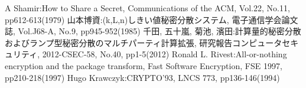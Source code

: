 \documentclass[twocolumn,a4paper]{jsarticle}
\begin{document}
	\begin{thebibliography}{99}
	\fontsize{8pt}{4mm}\selectfont
		A Shamir:How to Share a Secret, Communications of the ACM, Vol.22, No.11, pp612-613(1979)
		山本博資:(k,L,n)しきい値秘密分散システム, 電子通信学会論文誌, Vol.J68-A, No.9, pp945-952(1985)
		千田, 五十嵐, 菊池, 濱田:計算量的秘密分散およびランプ型秘密分散のマルチパーティ計算拡張, 研究報告コンピュータセキュリティ, 2012-CSEC-58, No.40, pp1-5(2012)
		Ronald L. Rivest:All-or-nothing encryption and the package transform, Fast Software Encryption, FSE 1997, pp210-218(1997)
		Hugo Krawczyk:CRYPTO'93, LNCS 773, pp136-146(1994)
	\end{thebibliography}
\end{document}
